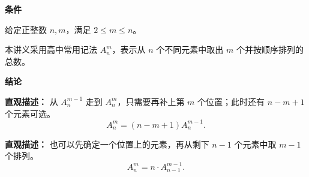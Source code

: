 \begin{statementbox}
\textbf{\textcolor{CStatement}{条件}}
\begin{description}[style=nextline, leftmargin=2.8em, labelsep=0.5em, itemsep=0.35em]
    \item[\textbf{\textcolor{CStatement}{条件1（正整数范围）：}}] 给定正整数 $n,m$，满足 $2 \le m \le n$。
    \item[\textbf{\textcolor{CStatement}{条件2（符号约定）：}}] 本讲义采用高中常用记法 $A_n^m$，表示从 $n$ 个不同元素中取出 $m$ 个并按顺序排列的总数。
\end{description}

\textbf{\textcolor{CStatement}{结论}}
\begin{description}[style=nextline, leftmargin=2.8em, labelsep=0.5em, itemsep=0.45em]
    \item[\textbf{\textcolor{CStatement}{结论一（按取出个数递推）：}}]
    \textbf{\textcolor{CStatement}{直观描述：}} 从 $A_n^{m-1}$ 走到 $A_n^m$，只需要再补上第 $m$ 个位置；此时还有 $n-m+1$ 个元素可选。
    \[
    A_n^m = (n-m+1)A_n^{m-1}.
    \]

    \item[\textbf{\textcolor{CStatement}{常见变形（先固定首位）：}}]
    \textbf{\textcolor{CStatement}{直观描述：}} 也可以先确定一个位置上的元素，再从剩下 $n-1$ 个元素中取 $m-1$ 个排列。
    \[
    A_n^m = n \cdot A_{n-1}^{m-1}.
    \]
\end{description}
\end{statementbox}
